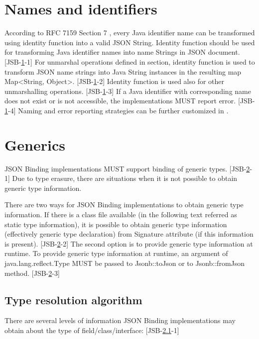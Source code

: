 \section{Names and identifiers}
\label{sec:naming}
According to RFC 7159 Section 7 \cite{rfc7159}, every Java identifier name can be transformed using identity function into a valid JSON String. Identity function should be used for transforming Java identifier names into name Strings in JSON document. [JSB-\ref{sec:naming}-1]
For unmarshal operations defined in  section, identity function is used to transform JSON name strings into Java String instances in the resulting map Map\textless String, Object\textgreater. [JSB-\ref{sec:naming}-2] Identity function is used also for other unmarshalling operations. [JSB-\ref{sec:naming}-3] If a Java identifier with corresponding name does not exist or is not accessible, the implementations MUST report error. [JSB-\ref{sec:naming}-4] Naming and error reporting strategies can be further customized in .

\section{Generics}
\label{sec:generics}
JSON Binding implementations MUST support binding of generic types. [JSB-\ref{sec:generics}-1] Due to type erasure, there are situations when it is not possible to obtain generic type information.

There are two ways for JSON Binding implementations to obtain generic type information. If there is a class file available (in the following text referred as static type information), it is possible to obtain generic type information (effectively generic type declaration) from Signature attribute (if this information is present). [JSB-\ref{sec:generics}-2] The second option is to provide generic type information at runtime. To provide generic type information at runtime, an argument of java.lang.reflect.Type MUST be passed to Jsonb::toJson or to Jsonb::fromJson method. [JSB-\ref{sec:generics}-3]

\subsection{Type resolution algorithm}
\label{sec:type_resolution_algorithm}
There are several levels of information JSON Binding implementations may obtain about the type of field/class/interface: [JSB-\ref{sec:type_resolution_algorithm}-1]

